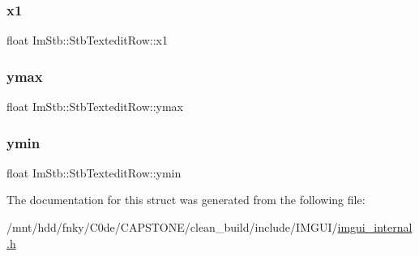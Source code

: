 \subsubsection{\texorpdfstring{x1}{x1}}
{\footnotesize\ttfamily float Im\+Stb\+::\+Stb\+Textedit\+Row\+::x1}

\mbox{\label{structImStb_1_1StbTexteditRow_a339f55d2fc566ca049596ee3286bbc87}} 
\subsubsection{\texorpdfstring{ymax}{ymax}}
{\footnotesize\ttfamily float Im\+Stb\+::\+Stb\+Textedit\+Row\+::ymax}

\mbox{\label{structImStb_1_1StbTexteditRow_a2b4c4926f3b556b5edb0010abd07a7c1}} 
\subsubsection{\texorpdfstring{ymin}{ymin}}
{\footnotesize\ttfamily float Im\+Stb\+::\+Stb\+Textedit\+Row\+::ymin}



The documentation for this struct was generated from the following file\+:\begin{DoxyCompactItemize}
\item 
/mnt/hdd/fnky/\+C0de/\+C\+A\+P\+S\+T\+O\+N\+E/clean\+\_\+build/include/\+I\+M\+G\+U\+I/\hyperlink{imgui__internal_8h}{imgui\+\_\+internal.\+h}\end{DoxyCompactItemize}

